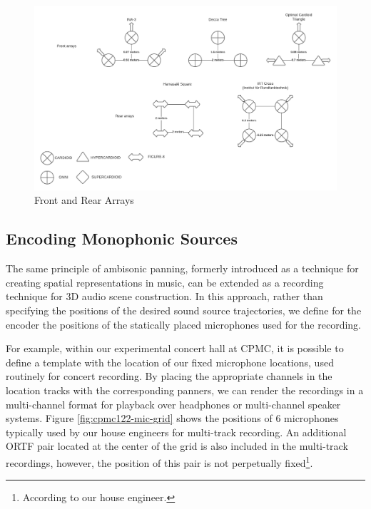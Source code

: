 \begin{figure}[ht!]%
\centering
\includegraphics[width=1.0\textwidth]{img/front-n-rear-arrays.pdf} 

\caption{Front and Rear Arrays}
\label{fig:fnr-arrays}
\end{figure}

\subsection{Encoding Monophonic Sources}


The same principle of ambisonic panning, formerly introduced as a technique for creating spatial representations in music, can be extended as a recording technique for 3D audio scene construction. In this approach, rather than specifying the positions of the desired sound source trajectories, we define for the encoder the positions of the statically placed microphones used for the recording. 

For example, within our experimental concert hall at CPMC, it is possible to define a template with the location of our fixed microphone locations, used routinely for concert recording. By placing the appropriate channels in the location tracks with the corresponding panners, we can render the recordings in a multi-channel format for playback over headphones or multi-channel speaker systems. Figure \ref{fig:cpmc122-mic-grid} shows the positions of 6 microphones typically used by our house engineers for multi-track recording. An additional ORTF pair located at the center of the grid is also included in the multi-track recordings, however, the position of this pair is not perpetually fixed\footnote{According to our house engineer.}. 

